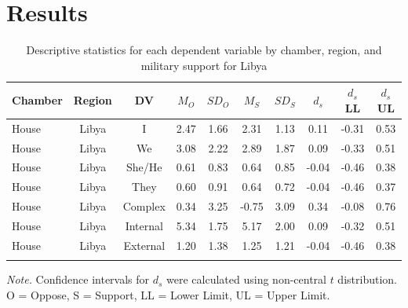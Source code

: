 \documentclass[english,,man]{apa6}
\theoremstyle{definition}
\theoremstyle{definition}
\theoremstyle{definition}
\theoremstyle{remark}
\begin{document}
\hypertarget{results-4}{%
\section{Results}\label{results-4}}

\begin{table}[tbp]
\begin{center}
\begin{threeparttable}
\caption{\label{tab:Ltable}Descriptive statistics for each dependent variable by chamber, 
          region, and military support for Libya}
\small{
\begin{tabular}{lccccccccc}
\toprule
Chamber & Region & DV & $M_O$ & $SD_O$ & $M_S$ & $SD_S$ & $d_s$ & $d_s$ LL & $d_s$ UL\\
\midrule
House & Libya & I & 2.47 & 1.66 & 2.31 & 1.13 & 0.11 & -0.31 & 0.53\\
House & Libya & We & 3.08 & 2.22 & 2.89 & 1.87 & 0.09 & -0.33 & 0.51\\
House & Libya & She/He & 0.61 & 0.83 & 0.64 & 0.85 & -0.04 & -0.46 & 0.38\\
House & Libya & They & 0.60 & 0.91 & 0.64 & 0.72 & -0.04 & -0.46 & 0.37\\
House & Libya & Complex & 0.34 & 3.25 & -0.75 & 3.09 & 0.34 & -0.08 & 0.76\\
House & Libya & Internal & 5.34 & 1.75 & 5.17 & 2.00 & 0.09 & -0.32 & 0.51\\
House & Libya & External & 1.20 & 1.38 & 1.25 & 1.21 & -0.04 & -0.46 & 0.38\\
\bottomrule
\addlinespace
\end{tabular}
}
\begin{tablenotes}[para]
\normalsize{\textit{Note.} Confidence intervals for $d_s$ were calculated using 
          non-central $t$ distribution. O = Oppose, S = Support, LL = Lower Limit, UL = Upper Limit.}
\end{tablenotes}
\end{threeparttable}
\end{center}
\end{table}
\end{document}
